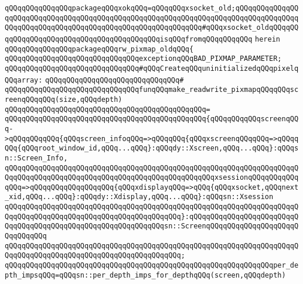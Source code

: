 \verb|qQQqqQQqqQQqqQQqpackageqQQqxokqQQq=qQQqqQQqxsocket_old;qQQqqQQqqQQqqQQqqQQqqQQqqQQqqQQqqQQqqQQqqQQqqQQqqQQqqQQqqQQqqQQqqQQqqQQqqQQqqQQqqQQqqQQqqQQqqQQqqQQqqQQqqQQqqQQqqQQqqQQqqQQqqQQqqQQq#qQQqxsocket_oldqQQqqQQqqQQqqQQqqQQqqQQqqQQqqQQqqQQqqQQqqQQqisqQQqfromqQQqqQQqqQQq|\newline
\verb|herein|\newline
\newline
\verb|qQQqqQQqqQQqqQQqpackageqQQqrw_pixmap_oldqQQq{|\newline
\newline
\verb|qQQqqQQqqQQqqQQqqQQqqQQqqQQqqQQqexceptionqQQqBAD_PIXMAP_PARAMETER;|\newline
\newline
\verb|qQQqqQQqqQQqqQQqqQQqqQQqqQQqqQQq#qQQqCreateqQQquninitializedqQQqpixelqQQqarray:|\newline
\verb|qQQqqQQqqQQqqQQqqQQqqQQqqQQqqQQq#|\newline
\verb|qQQqqQQqqQQqqQQqqQQqqQQqqQQqqQQqfunqQQqmake_readwrite_pixmapqQQqqQQqscreenqQQqqQQq(size,qQQqdepth)|\newline
\verb|qQQqqQQqqQQqqQQqqQQqqQQqqQQqqQQqqQQqqQQqqQQqqQQq=|\newline
\verb|qQQqqQQqqQQqqQQqqQQqqQQqqQQqqQQqqQQqqQQqqQQqqQQq{qQQqqQQqqQQqscreenqQQq->qQQqqQQqqQQq{qQQqscreen_infoqQQq=>qQQqqQQq{qQQqxscreenqQQqqQQq=>qQQqqQQq{qQQqroot_window_id,qQQq...qQQq}:qQQqdy::Xscreen,qQQq...qQQq}:qQQqsn::Screen_Info,|\newline
\verb|qQQqqQQqqQQqqQQqqQQqqQQqqQQqqQQqqQQqqQQqqQQqqQQqqQQqqQQqqQQqqQQqqQQqqQQqqQQqqQQqqQQqqQQqqQQqqQQqqQQqqQQqqQQqqQQqqQQqqQQqxsessionqQQqqQQqqQQqqQQq=>qQQqqQQqqQQqqQQqqQQq{qQQqxdisplayqQQq=>qQQq{qQQqxsocket,qQQqnext_xid,qQQq...qQQq}:qQQqdy::Xdisplay,qQQq...qQQq}:qQQqsn::Xsession|\newline
\verb|qQQqqQQqqQQqqQQqqQQqqQQqqQQqqQQqqQQqqQQqqQQqqQQqqQQqqQQqqQQqqQQqqQQqqQQqqQQqqQQqqQQqqQQqqQQqqQQqqQQqqQQqqQQqqQQq}:qQQqqQQqqQQqqQQqqQQqqQQqqQQqqQQqqQQqqQQqqQQqqQQqqQQqqQQqqQQqqQQqsn::ScreenqQQqqQQqqQQqqQQqqQQqqQQqqQQqqQQq|\newline
\verb|qQQqqQQqqQQqqQQqqQQqqQQqqQQqqQQqqQQqqQQqqQQqqQQqqQQqqQQqqQQqqQQqqQQqqQQqqQQqqQQqqQQqqQQqqQQqqQQqqQQqqQQqqQQqqQQq;|\newline
\newline
\verb|qQQqqQQqqQQqqQQqqQQqqQQqqQQqqQQqqQQqqQQqqQQqqQQqqQQqqQQqqQQqqQQqper_depth_impsqQQq=qQQqsn::per_depth_imps_for_depthqQQq(screen,qQQqdepth)|\newline
